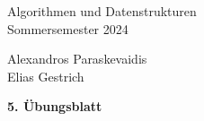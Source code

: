 \documentclass[11pt]{scrartcl}
\newcommand{\sheetNum}{5} %
\newcommand{\studentOne}{Alexandros Paraskevaidis} %
\newcommand{\studentTwo}{Elias Gestrich} %
\begin{document}
\begin{small}
\begin{minipage}{0.5 \linewidth}
  Algorithmen und Datenstrukturen\\
  Sommersemester 2024
\end{minipage}
\begin{minipage}{0.5\linewidth}
  \begin{flushright}
    \studentOne\\
    \studentTwo
  \end{flushright}
\end{minipage}
\end{small}
\begin{center}
\begin{sffamily}\Large\bfseries \sheetNum. Übungsblatt\end{sffamily}
\end{center}
\end{document}
